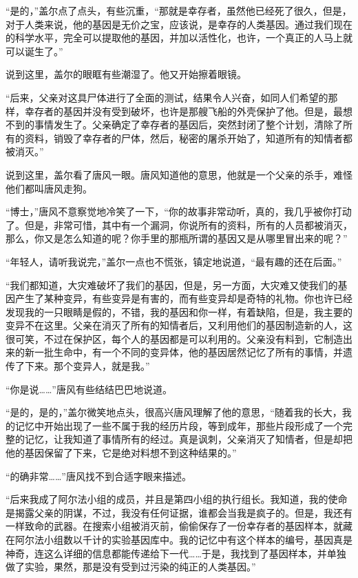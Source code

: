 “是的，”盖尔点了点头，有些沉重，“那就是幸存者，虽然他已经死了很久，但是，对于人类来说，他的基因是无价之宝，应该说，是幸存的人类基因。通过我们现在的科学水平，完全可以提取他的基因，并加以活性化，也许，一个真正的人马上就可以诞生了。”

说到这里，盖尔的眼眶有些潮湿了。他又开始擦着眼镜。

“后来，父亲对这具尸体进行了全面的测试，结果令人兴奋，如同人们希望的那样，幸存者的基因并没有受到破坏，也许是那艘飞船的外壳保护了他。但是，最想不到的事情发生了。父亲确定了幸存者的基因后，突然封闭了整个计划，清除了所有的资料，销毁了幸存者的尸体，然后，秘密的屠杀开始了，知道所有的知情者都被消灭。”

说到这里，盖尔看了唐风一眼。唐风知道他的意思，他就是一个父亲的杀手，难怪他们都叫唐风走狗。

“博士，”唐风不意察觉地冷笑了一下，“你的故事非常动听，真的，我几乎被你打动了。但是，非常可惜，其中有一个漏洞，你说所有的资料，所有的人员都被消灭，那么，你又是怎么知道的呢？你手里的那瓶所谓的基因又是从哪里冒出来的呢？”

“年轻人，请听我说完，”盖尔一点也不慌张，镇定地说道，“最有趣的还在后面。”

“我们都知道，大灾难破坏了我们的基因，但是，另一方面，大灾难又使我们的基因产生了某种变异，有些变异是有害的，而有些变异却是奇特的礼物。你也许已经发现我的一只眼睛是假的，不错，我的基因和你一样，有着缺陷，但是，我主要的变异不在这里。父亲在消灭了所有的知情者后，又利用他们的基因制造新的人，这很可笑，不过在保护区，每个人的基因都是可以利用的。父亲没有料到，它制造出来的新一批生命中，有一个不同的变异体，他的基因居然记忆了所有的事情，并遗传了下来。那个变异人，就是我。”

“你是说……”唐风有些结结巴巴地说道。

“是的，是的，”盖尔微笑地点头，很高兴唐风理解了他的意思，“随着我的长大，我的记忆中开始出现了一些不属于我的经历片段，等到成年，那些片段形成了一个完整的记忆，让我知道了事情所有的经过。真是讽刺，父亲消灭了知情者，但是却把他的基因保留了下来，它是绝对料想不到这种结果的。”

“的确非常……”唐风找不到合适字眼来描述。

“后来我成了阿尔法小组的成员，并且是第四小组的执行组长。我知道，我的使命是揭露父亲的阴谋，不过，我没有任何证据，谁都会当我是疯子的。但是，我还有一样致命的武器。在搜索小组被消灭前，偷偷保存了一份幸存者的基因样本，就藏在阿尔法小组数以千计的实验基因库中。我的记忆中有这个样本的编号，基因真是神奇，连这么详细的信息都能传递给下一代……于是，我找到了基因样本，并单独做了实验，果然，那是没有受到过污染的纯正的人类基因。”

